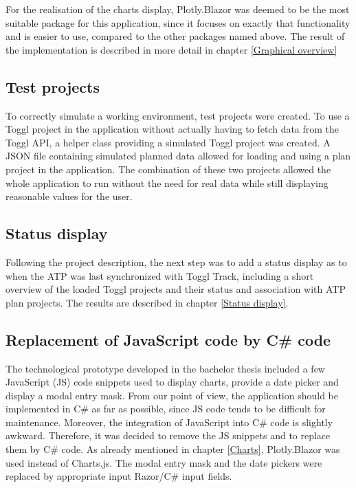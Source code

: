 For the realisation of the charts display, Plotly.Blazor was deemed to be the most suitable package for this application, since it focuses on exactly that functionality and is easier to use, compared to the other packages named above. The result of the implementation is described in more detail in chapter \ref{Graphical overview}

\subsection{Test projects}
To correctly simulate a working environment, test projects were created. To use a Toggl project in the application without actually having to fetch data from the Toggl API, a helper class providing a simulated Toggl project was created. A JSON file containing simulated planned data allowed for loading and using a plan project in the application. The combination of these two projects allowed the whole application to run without the need for real data while still displaying reasonable values for the user.

\subsection{Status display}
Following the project description, the next step was to add a status display as to when the ATP was last synchronized with Toggl Track, including a short overview of the loaded Toggl projects and their status and association with ATP plan projects. The results are described in chapter \ref{Status display}.

\subsection{Replacement of JavaScript code by C# code}
The technological prototype developed in the bachelor thesis included a few JavaScript (JS) code snippets used to display charts, provide a date picker and display a modal entry mask. From our point of view, the application should be implemented in C# as far as possible, since JS code tends to be difficult for maintenance. Moreover, the integration of JavaScript into C# code is slightly awkward. Therefore, it was decided to remove the JS snippets and to replace them by C# code. As already mentioned in chapter \ref{Charts}, Plotly.Blazor was used instead of Charts.js. The modal entry mask and the date pickers were replaced by appropriate input Razor/C# input fields.

